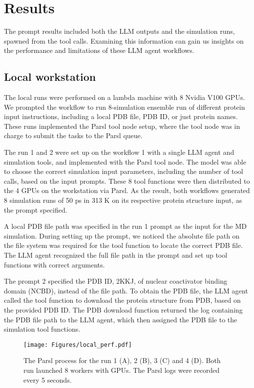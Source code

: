 \section{Results}
The prompt results included both the LLM outputs and the simulation runs, spawned from the tool calls. 
Examining this information can gain us insights on the performance and limitations of these LLM agent workflows. 

\subsection{Local workstation}
The local runs were performed on a lambda machine with 8 Nvidia V100 GPUs. 
We prompted the workflow to run 8-simulation ensemble run of different protein input instructions, including a local PDB file, PDB ID, or just protein names. 
These runs implemented the Parsl tool node setup, where the tool node was in charge to submit the tasks to the Parsl queue.  

The run 1 and 2 were set up on the workflow 1 with a single LLM agent and simulation tools, and implemented with the Parsl tool node. 
The model was able to choose the correct simulation input parameters, including the number of tool calls, based on the input prompts. 
These 8 tool functions were then distributed to the 4 GPUs on the workstation via Parsl. 
As the result, both workflows generated 8 simulation runs of 50 ps in 313 K on its respective protein structure input, as the prompt specified. 

A local PDB file path was specified in the run 1 prompt as the input for the MD simulation. 
During setting up the prompt, we noticed the absolute file path on the file system was required for the tool function to locate the correct PDB file.  
The LLM agent recognized the full file path in the prompt and set up tool functions with correct arguments. 

The prompt 2 specified the PDB ID, 2KKJ, of nuclear coactivator binding domain (NCBD), instead of the file path. 
To obtain the PDB file, the LLM agent called the tool function to download the protein structure from PDB, based on the provided PDB ID. 
The PDB download function returned the log containing the PDB file path to the LLM agent, which then assigned the PDB file to the simulation tool functions. 


\begin{figure*}
    \centering
    \texttt{[image: Figures/local\_perf.pdf]}
    \caption{The Parsl process for the run 1 (A), 2 (B), 3 (C) and 4 (D). Both run launched 8 workers with GPUs. The Parsl logs were recorded every 5 seconds.  }
    \Description{}
    \label{fig:local_run}
\end{figure*}


